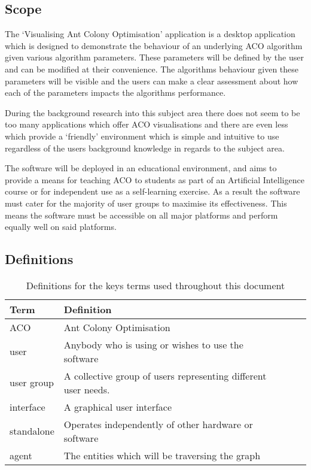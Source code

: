 \documentclass[10pt,a4paper]{article}
\begin{document}
\subsection{Scope}

The `Visualising Ant Colony Optimisation' application is a desktop application which is designed to demonstrate the behaviour of an underlying ACO algorithm given various algorithm parameters. These parameters will be defined by the user and can be modified at their convenience. The algorithms behaviour given these parameters will be visible and the users can make a clear assessment about how each of the parameters impacts the algorithms performance.

During the background research into this subject area there does not seem to be too many applications which offer ACO visualisations and there are even less which provide a `friendly' environment which is simple and intuitive to use regardless of the users background knowledge in regards to the subject area.

The software will be deployed in an educational environment, and aims to provide a means for teaching ACO to students as part of an Artificial Intelligence course or for independent use as a self-learning exercise. As a result the software must cater for the majority of user groups to maximise its effectiveness. This means the software must be accessible on all major platforms and perform equally well on said platforms.

\subsection{Definitions}

\begin{table}[h]
\centering
\begin{tabular}{|l|l|lll}
\textbf{Term} & \textbf{Definition}                                            \\ 
\hline
ACO           & Ant Colony Optimisation                              \\ 
user          & Anybody who is using or wishes to use the software      \\ 
user group    & A collective group of users representing different user needs. \\ 
interface       &A graphical user interface \\
standalone    &Operates independently of other hardware or software\\
agent		&The entities which will be traversing the graph \\
\end{tabular}
\caption{Definitions for the keys terms used throughout this document}
\end{table}
\end{document}

